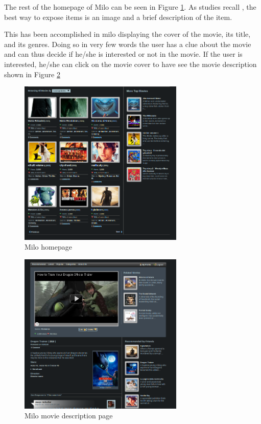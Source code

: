 The rest of the homepage of Milo can be seen in Figure \ref{fig:milo_homepage}. As studies recall \cite{applicaion-domain-and-functional-classification}, the best way to expose items is an image and a brief description of the item. 

This has been accomplished in milo displaying the cover of the movie, its title, and its genres. Doing so in very few words the user has a clue about the movie and can thus decide if he/she is interested or not in the movie. If the user is interested, he/she can click on the movie cover to have see the movie description shown in Figure \ref{fig:milo_movie} 

\begin{figure}
  \centering
  \includegraphics[width=0.7\textwidth]{figures/milo_homepage.png}
  \caption{Milo homepage}
  \label{fig:milo_homepage}
\end{figure}

\begin{figure}
  \centering
  \includegraphics[width=0.7\textwidth]{figures/milo_movie.png}
  \caption{Milo movie description page}
  \label{fig:milo_movie}
\end{figure}


